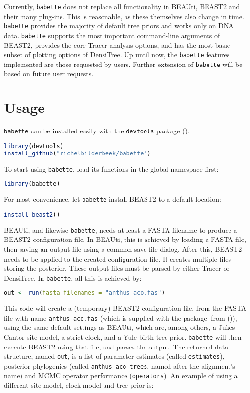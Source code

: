 \documentclass{article}
\begin{document}
Currently, \verb;babette; does not replace all functionality 
in BEAUti, BEAST2 and their many plug-ins.
This is reasonable, as these themselves also change in time.
\verb;babette; provides the majority of default tree priors and works only on DNA data. 
\verb;babette; supports the most important command-line arguments of BEAST2, provides
the core Tracer analysis options, and has the most basic subset of 
plotting options of DensiTree. Up until now, the \verb;babette; features 
implemented are those requested by users. Further extension of \verb;babette; 
will be based on future user requests.

\section{Usage}

\verb;babette; can be installed easily with the \verb;devtools; package (\cite{devtools}):

\begin{lstlisting}[language=R, floatplacement=H]
library(devtools)
install_github("richelbilderbeek/babette")
\end{lstlisting}
To start using \verb;babette;, load its functions in the global namespace first:

\begin{lstlisting}[language=R, floatplacement=H]
library(babette)
\end{lstlisting}
For most convenience, let \verb;babette; install BEAST2 to a default location:

\begin{lstlisting}[language=R, floatplacement=H]
install_beast2()
\end{lstlisting}
BEAUti, and likewise \verb;babette;, needs at least a FASTA filename
to produce a BEAST2 configuration file. 
In BEAUti, this is achieved by loading a FASTA file, 
then saving an output file using a common
save file dialog. After this, BEAST2 needs to be applied to
the created configuration file. It creates multiple files
storing the posterior. These output
files must be parsed by either Tracer or DensiTree.
In \verb;babette;, all this is achieved by:

\begin{lstlisting}[language=R, floatplacement=H]
out <- run(fasta_filenames = "anthus_aco.fas")
\end{lstlisting}
This code will create a (temporary) BEAST2 configuration file,
from the FASTA file with name \verb;anthus_aco.fas; (which
is supplied with the package, from (\cite{VanEls2018})), 
using the same default settings as BEAUti, which are, 
among others, a Jukes-Cantor site model, a strict clock, and a Yule birth tree prior.
\verb;babette; will then execute BEAST2 using that file, and
parses the output. The returned data structure, named \verb;out;, 
is a list of parameter estimates (called \verb;estimates;), posterior 
phylogenies (called \verb;anthus_aco_trees;, named after
the alignment's name) and MCMC operator performance (\verb;operators;).
An example of using a different site model, clock model 
and tree prior is:
\end{document}
